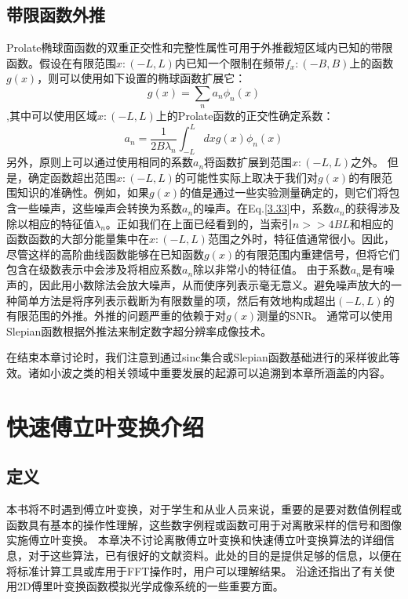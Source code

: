 \documentclass[12pt, UTF8]{ctexart}%
\numberwithin{equation}{section}
\numberwithin{figure}{section}
\newcommand{\InsertEqution}[2]{\begin{equation}
  \label{#1}
   #2
 \end{equation}}
\newcommand{\RefEq}[1]{Eq.\ref{#1}}
\newcommand{\InsertInlineEq}[1]{$#1$}
\begin{document}
\begin{sloppypar}
  \subsection{带限函数外推}
  Prolate椭球面函数的双重正交性和完整性属性可用于外推截短区域内已知的带限函数。假设在有限范围\InsertInlineEq{x:(-L,L)}内已知一个限制在频带\InsertInlineEq{f_x:(-B,B)}上的函数\InsertInlineEq{g(x)}，则可以使用如下设置的椭球函数扩展它：\InsertEqution{3.32}{g(x)=\sum_{n} a_{n} \phi_{n}(x)},其中可以使用区域\InsertInlineEq{x:(-L,L)}上的Prolate函数的正交性确定系数：\InsertEqution{3.33}{a_{n}=\frac{1}{2 B \lambda_{n}} \int_{-L}^{L} d x g(x) \phi_{n}(x)}
  另外，原则上可以通过使用相同的系数\InsertInlineEq{a_n}将函数扩展到范围\InsertInlineEq{x:(-L,L)}之外。 但是，确定函数超出范围\InsertInlineEq{x:(-L,L)}的可能性实际上取决于我们对\InsertInlineEq{g(x)}的有限范围知识的准确性。例如，如果\InsertInlineEq{g(x)}的值是通过一些实验测量确定的，则它们将包含一些噪声，这些噪声会转换为系数\InsertInlineEq{a_n}的噪声。在\RefEq{3.33}中，系数\InsertInlineEq{a_n}的获得涉及除以相应的特征值\InsertInlineEq{\lambda_n}。正如我们在上面已经看到的，当索引\InsertInlineEq{n>>4 B L}和相应的函数函数的大部分能量集中在\InsertInlineEq{x:(-L,L)}范围之外时，特征值通常很小。因此，尽管这样的高阶曲线函数能够在已知函数\InsertInlineEq{g(x)}的有限范围内重建信号，但将它们包含在级数表示中会涉及将相应系数\InsertInlineEq{a_n}除以非常小的特征值。 由于系数\InsertInlineEq{a_n}是有噪声的，因此用小数除法会放大噪声，从而使序列表示毫无意义。避免噪声放大的一种简单方法是将序列表示截断为有限数量的项，然后有效地构成超出\InsertInlineEq{(-L,L)}的有限范围的外推。外推的问题严重的依赖于对\InsertInlineEq{g(x)}测量的SNR。 通常可以使用Slepian函数根据外推法来制定数字超分辨率成像技术。

  在结束本章讨论时，我们注意到通过sinc集合或Slepian函数基础进行的采样彼此等效。诸如小波之类的相关领域中重要发展的起源可以追溯到本章所涵盖的内容。
\section{快速傅立叶变换介绍}
\subsection{定义}
本书将不时遇到傅立叶变换，对于学生和从业人员来说，重要的是要对数值例程或函数具有基本的操作性理解，这些数字例程或函数可用于对离散采样的信号和图像实施傅立叶变换。 本章决不讨论离散傅立叶变换和快速傅立叶变换算法的详细信息，对于这些算法，已有很好的文献资料。此处的目的是提供足够的信息，以便在将标准计算工具或库用于FFT操作时，用户可以理解结果。 沿途还指出了有关使用2D傅里叶变换函数模拟光学成像系统的一些重要方面。


\end{sloppypar}
\end{document}
